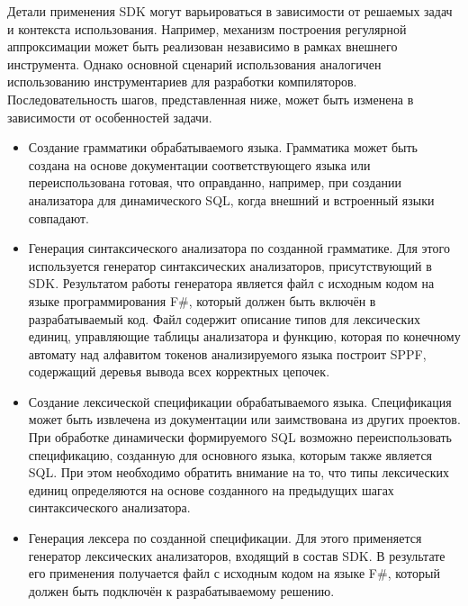 Детали применения SDK могут варьироваться в зависимости от решаемых задач и контекста использования. Например, механизм построения регулярной аппроксимации может быть реализован независимо в рамках внешнего инструмента. Однако основной сценарий использования аналогичен использованию инструментариев для разработки компиляторов. Последовательность шагов, представленная ниже, может быть изменена в зависимости от особенностей задачи.

\begin{itemize}
    \item Создание грамматики обрабатываемого языка. Грамматика может быть создана на основе документации соответствующего языка или переиспользована готовая, что оправданно, например, при создании анализатора для динамического SQL, когда внешний и встроенный языки совпадают.
    \item Генерация синтаксического анализатора по созданной грамматике. Для этого используется генератор синтаксических анализаторов, присутствующий в SDK. Результатом работы генератора является файл с исходным кодом на языке программирования F\#, который должен быть включён в разрабатываемый код. Файл содержит описание типов для лексических единиц, управляющие таблицы анализатора и функцию, которая по конечному автомату над алфавитом токенов анализируемого языка построит SPPF, содержащий деревья вывода всех корректных цепочек.
    \item Создание лексической спецификации обрабатываемого языка. Спецификация может быть извлечена из документации или заимствована из других проектов. При обработке динамически формируемого SQL возможно переиспользовать спецификацию, созданную для основного языка, которым также является SQL. При этом необходимо обратить внимание на то, что типы лексических единиц определяются на основе созданного на предыдущих шагах синтаксического анализатора.
    \item Генерация лексера по созданной спецификации. Для этого применяется генератор лексических анализаторов, входящий в состав SDK. В результате его применения получается файл с исходным кодом на языке F\#, который должен быть подключён к разрабатываемому решению. 

\end{itemize}
